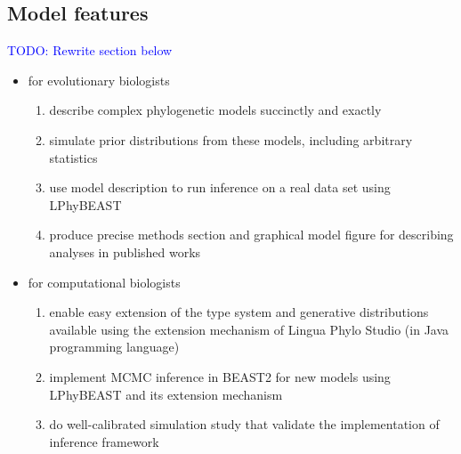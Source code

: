 \documentclass[10pt,letterpaper,table]{article}
\begin{document}
{%






\subsection{Model features}

\textcolor{blue}{TODO: Rewrite section below}

\begin{itemize}
\item for evolutionary biologists
\begin{enumerate}
\item describe complex phylogenetic models succinctly and exactly
\item simulate prior distributions from these models, including arbitrary statistics
\item use model description to run inference on a real data set using LPhyBEAST
\item produce precise methods section and graphical model figure for describing analyses in published works
\end{enumerate}
\item for computational biologists
\begin{enumerate}
\item enable easy extension of the type system and generative distributions available using the extension mechanism of Lingua Phylo Studio (in Java programming language)
\item implement MCMC inference in BEAST2 for new models using LPhyBEAST and its extension mechanism
\item do well-calibrated simulation study that validate the implementation of inference framework
\end{enumerate}
\end{itemize}


}
\end{document}
